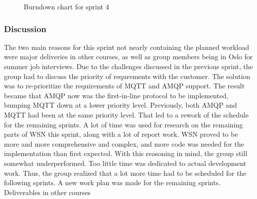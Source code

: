 \begin{center}
  \begin{figure}[ht!]
    \caption{Burndown chart for sprint 4}
    \label{fig:sprint 4, burndown}
  \end{figure}
\end{center}

\subsubsection{Discussion}

The two main reasons for this sprint not nearly containing the planned workload were major deliveries in other courses, as well as group members being in Oslo for summer job interviews.
Due to the challenges discussed in the previous sprint, the group had to discuss the priority of requrements with the customer. The solution was to re-prioritize the requirements of MQTT and AMQP support. The result became that AMQP now was the first-in-line protocol to be implemented, bumping MQTT down at a lower priority level. Previously, both AMQP and MQTT had been at the same priority level. That led to a rework of the schedule for the remaining sprints. A lot of time was used for research on the remaining parts of WSN this sprint, along with a lot of report work. WSN proved to be more and more comprehensive and complex, and more code was needed for the implementation than first expected. With this reasoning in mind, the group still somewhat underperformed. Too little time was dedicated to actual development work. Thus, the group realized that a lot more time had to be scheduled for the following sprints. A new work plan was made for the remaining sprints. Deliverables in other courses 

